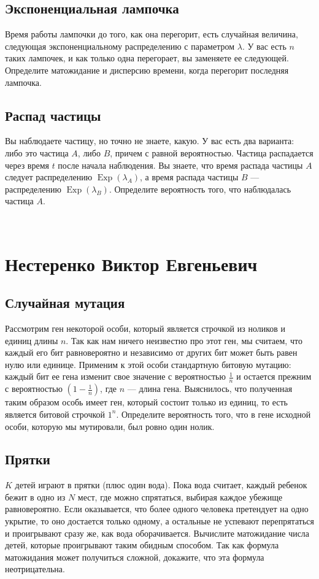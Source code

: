\documentclass[12pt]{article}
\DeclareMathOperator{\Exp}{Exp}
\begin{document}
\subsection{Экспоненциальная лампочка}
Время работы лампочки до того, как она перегорит, есть случайная величина, следующая экспоненциальному распределению с параметром $\lambda$. У вас есть $n$ таких лампочек, и как только одна перегорает, вы заменяете ее следующей. Определите матожидание и дисперсию времени, когда перегорит последняя лампочка.

\subsection{Распад частицы}
Вы наблюдаете частицу, но точно не знаете, какую. У вас есть два варианта: либо это частица $A$, либо $B$, причем с равной вероятностью. Частица распадается через время $t$ после начала наблюдения. Вы знаете, что время распада частицы $A$ следует распределению $\Exp(\lambda_A)$, а время распада частицы $B$ --- распределению $\Exp(\lambda_B)$. Определите вероятность того, что наблюдалась частица $A$.

\newpage
~
\newpage
\section{Нестеренко Виктор Евгеньевич}

\subsection{Случайная мутация}
Рассмотрим ген некоторой особи, который является строчкой из ноликов и единиц длины $n$. Так как нам ничего неизвестно про этот ген, мы считаем, что каждый его бит равновероятно и независимо от других бит может быть равен нулю или единице. Применим к этой особи стандартную битовую мутацию: каждый бит ее гена изменит свое значение с вероятностью $\frac{1}{n}$ и остается прежним с вероятностью $(1 - \frac{1}{n})$, где $n$ --- длина гена. Выяснилось, что полученная таким образом особь имеет ген, который состоит только из единиц, то есть является битовой строчкой $1^n$. Определите вероятность того, что в гене исходной особи, которую мы мутировали, был ровно один нолик.

\subsection{Прятки}
$K$ детей играют в прятки (плюс один вода). Пока вода считает, каждый ребенок бежит в одно из $N$ мест, где можно спрятаться, выбирая каждое убежище равновероятно. Если оказывается, что более одного человека претендует на одно укрытие, то оно достается только одному, а остальные не успевают перепрятаться и проигрывают сразу же, как вода оборачивается. Вычислите матожидание числа детей, которые проигрывают таким обидным способом. Так как формула матожидания может получиться сложной, докажите, что эта формула неотрицательна.
\end{document}
